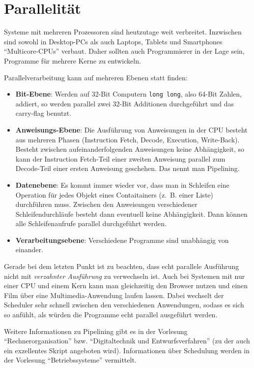 \chapter{Parallelität}
Systeme mit mehreren Prozessoren sind heutzutage weit verbreitet. Inzwischen
sind sowohl in Desktop-PCs als auch Laptops, Tablets und Smartphones 
\enquote{Multicore-CPUs} verbaut. Daher sollten auch Programmierer in der Lage 
sein, Programme für mehrere Kerne zu entwickeln.

Parallelverarbeitung kann auf mehreren Ebenen statt finden:
\begin{itemize}
    \item \textbf{Bit-Ebene}: Werden auf 32-Bit Computern \texttt{long long}, also
          64-Bit Zahlen, addiert, so werden parallel zwei 32-Bit Additionen durchgeführt und
          das carry-flag benutzt.
    \item \textbf{Anweisungs-Ebene}: Die Ausführung von Anweisungen in der CPU
          besteht aus mehreren Phasen (Instruction Fetch, Decode, Execution, Write-Back).
          Besteht zwischen aufeinanderfolgenden Anweisungen keine Abhängigkeit,
          so kann der Instruction Fetch-Teil einer zweiten Anweisung parallel zum
          Decode-Teil einer ersten Anweisung geschehen. Das nennt man Pipelining.
    \item \textbf{Datenebene}: Es kommt immer wieder vor, dass man in Schleifen
          eine Operation für jedes Objekt eines Contaitainers (z.~B. einer Liste)
          durchführen muss. Zwischen den Anweisungen verschiedener Schleifendurchläufe
          besteht dann eventuell keine Abhängigkeit. Dann können alle Schleifenaufrufe
          parallel durchgeführt werden.
    \item \textbf{Verarbeitungsebene}: Verschiedene Programme sind unabhängig
          von einander.
\end{itemize}

Gerade bei dem letzten Punkt ist zu beachten, dass echt parallele Ausführung nicht mit \textit{verzahnter Ausführung} zu verwechseln ist. Auch bei Systemen mit nur einer CPU und einem Kern kann man gleichzeitig den Browser nutzen und einen Film über eine Multimedia-Anwendung laufen lassen. Dabei wechselt der Scheduler sehr schnell zwischen den verschiedenen
Anwendungen, sodass es sich so anfühlt, als würden die Programme echt parallel
ausgeführt werden.

Weitere Informationen zu Pipelining gibt es in der Vorlesung \enquote{Rechnerorganisation}
bzw. \enquote{Digitaltechnik und Entwurfsverfahren} (zu der auch ein exzellentes Skript angeboten wird). Informationen über Schedulung werden in der Vorlesung \enquote{Betriebssysteme}
vermittelt.

